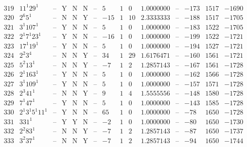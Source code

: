 \documentclass[11pt,reqno,a4letter]{article}
\numberwithin{figure}{section}
\numberwithin{table}{section}
\theoremstyle{plain}
\numberwithin{theorem}{section}
\theoremstyle{definition}
\begin{document}
\begin{table}[h!]
\begin{equation*}
{\begin{array}{|cc|c|ccc|c|c|ccc|c|ccc}
 319 & 11^1 29^1 & \text{--} & \text{Y} & \text{N} & \text{N} & \text{--} & 5 & 1 & 0 & 1.0000000 & \text{--} & -173 & 1517 & -1690 \\
 320 & 2^6 5^1 & \text{--} & \text{N} & \text{N} & \text{Y} & \text{--} & -15 & 1 & 10 & 2.3333333 & \text{--} & -188 & 1517 & -1705 \\
 321 & 3^1 107^1 & \text{--} & \text{Y} & \text{N} & \text{N} & \text{--} & 5 & 1 & 0 & 1.0000000 & \text{--} & -183 & 1522 & -1705 \\
 322 & 2^1 7^1 23^1 & \text{--} & \text{Y} & \text{N} & \text{N} & \text{--} & -16 & 1 & 0 & 1.0000000 & \text{--} & -199 & 1522 & -1721 \\
 323 & 17^1 19^1 & \text{--} & \text{Y} & \text{N} & \text{N} & \text{--} & 5 & 1 & 0 & 1.0000000 & \text{--} & -194 & 1527 & -1721 \\
 324 & 2^2 3^4 & \text{--} & \text{N} & \text{N} & \text{Y} & \text{--} & 34 & 1 & 29 & 1.6176471 & \text{--} & -160 & 1561 & -1721 \\
 325 & 5^2 13^1 & \text{--} & \text{N} & \text{N} & \text{Y} & \text{--} & -7 & 1 & 2 & 1.2857143 & \text{--} & -167 & 1561 & -1728 \\
 326 & 2^1 163^1 & \text{--} & \text{Y} & \text{N} & \text{N} & \text{--} & 5 & 1 & 0 & 1.0000000 & \text{--} & -162 & 1566 & -1728 \\
 327 & 3^1 109^1 & \text{--} & \text{Y} & \text{N} & \text{N} & \text{--} & 5 & 1 & 0 & 1.0000000 & \text{--} & -157 & 1571 & -1728 \\
 328 & 2^3 41^1 & \text{--} & \text{N} & \text{N} & \text{Y} & \text{--} & 9 & 1 & 4 & 1.5555556 & \text{--} & -148 & 1580 & -1728 \\
 329 & 7^1 47^1 & \text{--} & \text{Y} & \text{N} & \text{N} & \text{--} & 5 & 1 & 0 & 1.0000000 & \text{--} & -143 & 1585 & -1728 \\
 330 & 2^1 3^1 5^1 11^1 & \text{--} & \text{Y} & \text{N} & \text{N} & \text{--} & 65 & 1 & 0 & 1.0000000 & \text{--} & -78 & 1650 & -1728 \\
 331 & 331^1 & \text{--} & \text{Y} & \text{Y} & \text{N} & \text{--} & -2 & 1 & 0 & 1.0000000 & \text{--} & -80 & 1650 & -1730 \\
 332 & 2^2 83^1 & \text{--} & \text{N} & \text{N} & \text{Y} & \text{--} & -7 & 1 & 2 & 1.2857143 & \text{--} & -87 & 1650 & -1737 \\
 333 & 3^2 37^1 & \text{--} & \text{N} & \text{N} & \text{Y} & \text{--} & -7 & 1 & 2 & 1.2857143 & \text{--} & -94 & 1650 & -1744 \\

\end{array}}
\end{equation*}
\end{table}
\end{document}

